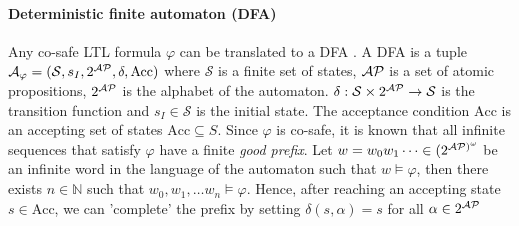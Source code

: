 \paragraph*{Deterministic finite automaton (DFA)} Any co-safe LTL formula $\varphi$ can be translated to a DFA \cite{kupferman2001model}. A DFA is a tuple $\mathcal{A}_{\varphi} = (\mathcal{S},s_I,2^{\mathcal{AP}}, \delta,\textrm{Acc})$ where $\mathcal{S}$ is a finite set of states, $\mathcal{AP}$ is a set of atomic propositions, $2^{\mathcal{AP}}$ is the alphabet of the automaton. $\delta: \mathcal{S} \times 2^{\mathcal{AP}} \rightarrow \mathcal{S} $ is the transition function and $s_I \in \mathcal{S}$ is the initial state. The acceptance condition $\textrm{Acc}$ is an accepting set of states $\textrm{Acc} \subseteq S$. Since $\varphi$ is co-safe, it is known that all infinite sequences that satisfy $\varphi$ have a finite \emph{good prefix}. Let $w = w_0 w_1 \dots \in (2^{{\mathcal{AP}})^{\omega}}$ be an infinite word in the language of the automaton such that $w \vDash \varphi$, then there exists $n\in \mathbb{N}$ such that $w_0,w_1,\dots w_n \vDash \varphi$. Hence, after reaching an accepting state $s \in \textrm{Acc}$, we can 'complete' the prefix by setting $\delta(s,\alpha) = s$ for all $\alpha \in 2^{\mathcal{AP}}$



